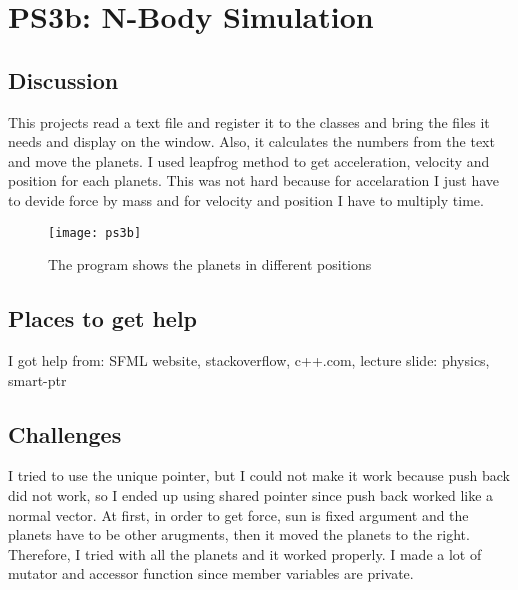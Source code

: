 \section{PS3b: N-Body Simulation}\label{sec:ps3b}

\subsection{Discussion}\label{sec:ps3b:disc}

This projects read a text file and register it to the classes and bring the files it needs and display on the window. Also, it calculates the numbers from the text and move the planets. 
I used leapfrog method to get acceleration, velocity and position for each planets. This was not hard because for accelaration I just have to devide force by mass and for velocity and position I have to multiply time.

\begin{figure}[tbh]
	\centering
	\texttt{[image: ps3b]}
	\caption{The program shows the planets in different positions}
	\label{fig:ps3b}
\end{figure}

\subsection{Places to get help}
I got help from: SFML website, stackoverflow, c++.com, lecture slide: physics, smart-ptr




\subsection{Challenges}\label{sec:ps3b:challenges}

I tried to use the unique pointer, but I could not make it work because push back did not work, so I ended up using shared pointer since push back worked like a normal vector.
At first, in order to get force, sun is fixed argument and the planets have to be other arugments, then it moved the planets to the right. Therefore, I tried with all the planets and it worked properly.
I made a lot of mutator and accessor function since member variables are private.

